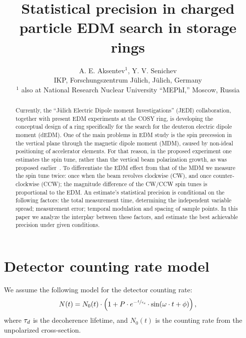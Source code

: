 \documentclass{jacow}
\begin{document}
\title{Statistical precision in charged particle EDM search in storage rings}
\author{A. E. Aksentev$^1$\footnotemark[2], Y. V. Senichev  \\IKP, Forschungszentrum J\"ulich, J\"ulich, Germany \\$^1$ also at National Research Nuclear University ``MEPhI,'' Moscow, Russia}
\maketitle
{}

\begin{abstract}
	Currently, the ``J\"ulich Electric Dipole moment Investigations'' (JEDI) collaboration, together with present EDM experiments at the COSY ring, is developing the conceptual design of a ring specifically for the search for the deuteron electric dipole moment (dEDM). One of the main problems in EDM study is the spin precession in the vertical plane through the magnetic dipole moment (MDM), caused by non-ideal positioning of accelerator elements. For that reason, in the proposed experiment one estimates the spin tune, rather than the vertical beam polarization growth, as was proposed earlier~\cite{BNL}. To differentiate the EDM effect from that of the MDM we measure the spin tune twice: once when the beam revolves clockwise (CW), and once counter-clockwise (CCW); the magnitude difference of the CW/CCW spin tunes is proportional to the EDM. An estimate's statistical precision is conditional on the following factors: the total measurement time, determining the independent variable spread; measurement error; temporal modulation and spacing of sample points. In this paper we analyze the interplay between these factors, and estimate the best achievable precision under given conditions.
\end{abstract}

\section{Detector counting rate model}
We assume the following model for the detector counting rate:
\begin{equation}\label{eq:DetCntRt}
	N(t) = N_0(t)\cdot\bkt{1 + P\cdot e^{-\sfrac{t}{\LTd}}\cdot\sin(\omega\cdot t + \phi)},
\end{equation}
where $\tau_d$ is the decoherence lifetime, and $N_0(t)$ is the counting rate from the unpolarized cross-section.
\end{document}
